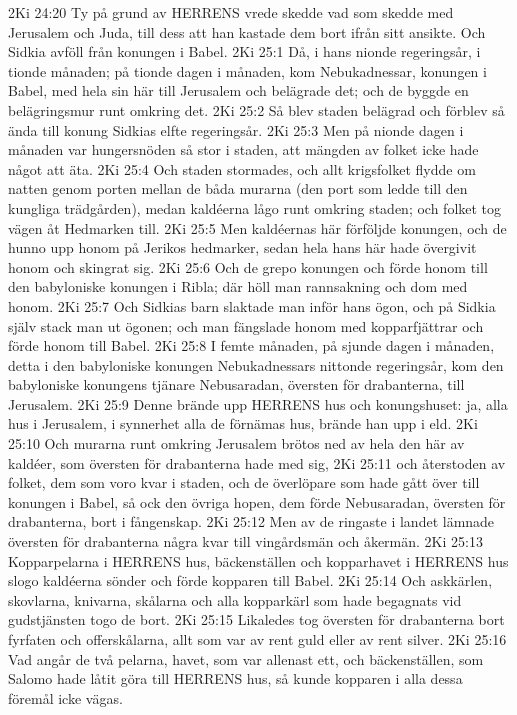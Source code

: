 2Ki 24:20  Ty på grund av HERRENS vrede skedde vad som skedde med Jerusalem och Juda, till dess att han kastade dem bort ifrån sitt ansikte. Och Sidkia avföll från konungen i Babel.
2Ki 25:1  Då, i hans nionde regeringsår, i tionde månaden; på tionde dagen i månaden, kom Nebukadnessar, konungen i Babel, med hela sin här till Jerusalem och belägrade det; och de byggde en belägringsmur runt omkring det.
2Ki 25:2  Så blev staden belägrad och förblev så ända till konung Sidkias elfte regeringsår.
2Ki 25:3  Men på nionde dagen i månaden var hungersnöden så stor i staden, att mängden av folket icke hade något att äta.
2Ki 25:4  Och staden stormades, och allt krigsfolket flydde om natten genom porten mellan de båda murarna (den port som ledde till den kungliga trädgården), medan kaldéerna lågo runt omkring staden; och folket tog vägen åt Hedmarken till.
2Ki 25:5  Men kaldéernas här förföljde konungen, och de hunno upp honom på Jerikos hedmarker, sedan hela hans här hade övergivit honom och skingrat sig.
2Ki 25:6  Och de grepo konungen och förde honom till den babyloniske konungen i Ribla; där höll man rannsakning och dom med honom.
2Ki 25:7  Och Sidkias barn slaktade man inför hans ögon, och på Sidkia själv stack man ut ögonen; och man fängslade honom med kopparfjättrar och förde honom till Babel.
2Ki 25:8  I femte månaden, på sjunde dagen i månaden, detta i den babyloniske konungen Nebukadnessars nittonde regeringsår, kom den babyloniske konungens tjänare Nebusaradan, översten för drabanterna, till Jerusalem.
2Ki 25:9  Denne brände upp HERRENS hus och konungshuset: ja, alla hus i Jerusalem, i synnerhet alla de förnämas hus, brände han upp i eld.
2Ki 25:10  Och murarna runt omkring Jerusalem brötos ned av hela den här av kaldéer, som översten för drabanterna hade med sig,
2Ki 25:11  och återstoden av folket, dem som voro kvar i staden, och de överlöpare som hade gått över till konungen i Babel, så ock den övriga hopen, dem förde Nebusaradan, översten för drabanterna, bort i fångenskap.
2Ki 25:12  Men av de ringaste i landet lämnade översten för drabanterna några kvar till vingårdsmän och åkermän.
2Ki 25:13  Kopparpelarna i HERRENS hus, bäckenställen och kopparhavet i HERRENS hus slogo kaldéerna sönder och förde kopparen till Babel.
2Ki 25:14  Och askkärlen, skovlarna, knivarna, skålarna och alla kopparkärl som hade begagnats vid gudstjänsten togo de bort.
2Ki 25:15  Likaledes tog översten för drabanterna bort fyrfaten och offerskålarna, allt som var av rent guld eller av rent silver.
2Ki 25:16  Vad angår de två pelarna, havet, som var allenast ett, och bäckenställen, som Salomo hade låtit göra till HERRENS hus, så kunde kopparen i alla dessa föremål icke vägas.

